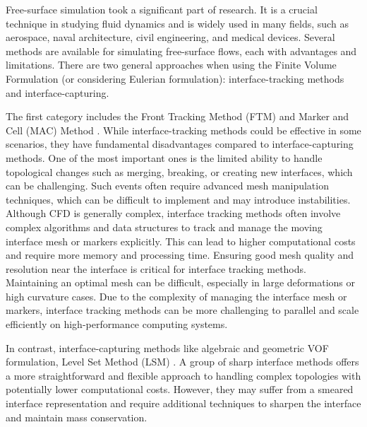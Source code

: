 Free-surface simulation took a significant part of research. It is a crucial technique in studying fluid dynamics and is widely used in many fields, such as aerospace, naval architecture, civil engineering, and medical devices. Several methods are available for simulating free-surface flows, each with advantages and limitations. There are two general approaches when using the Finite Volume Formulation (or considering Eulerian formulation): interface-tracking methods and interface-capturing.

The first category includes the Front Tracking Method (FTM)\cite{front-tracking} and Marker and Cell (MAC) Method \cite{mac}. While interface-tracking methods could be effective in some scenarios, they have fundamental disadvantages compared to interface-capturing methods. One of the most important ones is the limited ability to handle topological changes such as merging, breaking, or creating new interfaces, which can be challenging. Such events often require advanced mesh manipulation techniques, which can be difficult to implement and may introduce instabilities. Although CFD is generally complex, interface tracking methods often involve complex algorithms and data structures to track and manage the moving interface mesh or markers explicitly. This can lead to higher computational costs and require more memory and processing time.
Ensuring good mesh quality and resolution near the interface is critical for interface tracking methods. Maintaining an optimal mesh can be difficult, especially in large deformations or high curvature cases. Due to the complexity of managing the interface mesh or markers, interface tracking methods can be more challenging to parallel and scale efficiently on high-performance computing systems.

In contrast, interface-capturing methods like algebraic \cite{algebraicVOF} and geometric VOF \cite{roenby2019isoadvector} formulation, Level Set Method (LSM) \cite{VOF_level_set}. A group of sharp interface methods \cite{sharp-interface} offers a more straightforward and flexible approach to handling complex topologies with potentially lower computational costs. However, they may suffer from a smeared interface representation and require additional techniques to sharpen the interface and maintain mass conservation.

